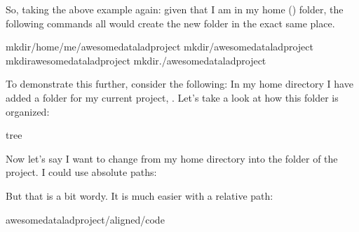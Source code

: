 \sphinxAtStartPar
So, taking the above example again: given that I am in my home (\sphinxcode{\sphinxupquote{\textasciitilde{}}}) folder,
the following commands all would create the new folder in the exact same place.

\begin{sphinxVerbatim}[commandchars=\\\{\}]
mkdir/home/me/awesome\PYGZus{}datalad\PYGZus{}project
mkdir\PYGZti{}/awesome\PYGZus{}datalad\PYGZus{}project
mkdirawesome\PYGZus{}datalad\PYGZus{}project
mkdir./awesome\PYGZus{}datalad\PYGZus{}project
\end{sphinxVerbatim}

\sphinxAtStartPar
To demonstrate this further, consider the following: In my home directory
 I have added a folder for my current project,
. Let’s take a look at how this folder is organized:

\begin{sphinxVerbatim}[commandchars=\\\{\}]
tree
\end{sphinxVerbatim}

\sphinxAtStartPar
Now let’s say I want to change from my home directory  into the 
folder of the project. I could use absolute paths:

\sphinxAtStartPar
{}

\sphinxAtStartPar
But that is a bit wordy. It is much easier with a relative path:

\begin{sphinxVerbatim}[commandchars=\\\{\}]
awesome\PYGZus{}datalad\PYGZus{}project/aligned/code
\end{sphinxVerbatim}

